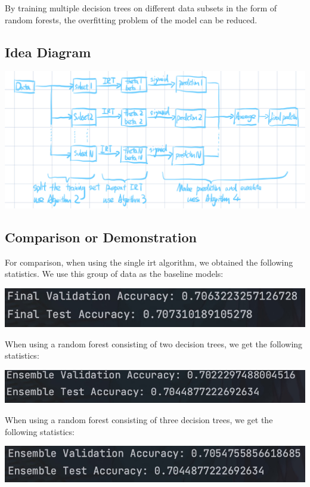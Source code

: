 \documentclass{article}
\begin{document}
By training multiple decision trees on different data subsets in the form of random forests, the overfitting problem of the model can be reduced.

\subsection*{Idea Diagram}

\includegraphics[width=1.0\linewidth]{笔记 2024年8月9日.jpeg}

\subsection*{Comparison or Demonstration}

For comparison, when using the single irt algorithm, we obtained the following statistics. We use this group of data as the baseline models:

\includegraphics[width=0.7\linewidth]{6061723195551_.pic.jpg}

When using a random forest consisting of two decision trees, we get the following statistics:

\includegraphics[width=0.7\linewidth]{6081723195750_.pic.jpg}

When using a random forest consisting of three decision trees, we get the following statistics:

\includegraphics[width=0.7\linewidth]{6101723195879_.pic.jpg}
\end{document}

